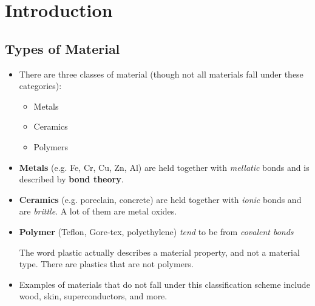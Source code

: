 \section{Introduction}
\subsection{Types of Material}
\begin{itemize}
    \item There are three classes of material (though not all materials fall under these categories):
    \begin{itemize}
        \item Metals
        \item Ceramics 
        \item Polymers
    \end{itemize}
    \item \textbf{Metals} (e.g. Fe, Cr, Cu, Zn, Al) are held together with \emph{mellatic} bonds and is described by \textbf{bond theory}.
    \item \textbf{Ceramics} (e.g. poreclain, concrete) are held together with \emph{ionic} bonds and are \emph{brittle}. A lot of them are metal oxides.
    \item \textbf{Polymer} (Teflon\textregistered, Gore-tex\textregistered, polyethylene) \emph{tend} to be from \emph{covalent bonds}
    \begin{warning}
        The word plastic actually describes a material property, and not a material type. There are plastics that are not polymers.
    \end{warning}
    \item Examples of materials that do not fall under this classification scheme include wood, skin, superconductors, and more.
\end{itemize}
